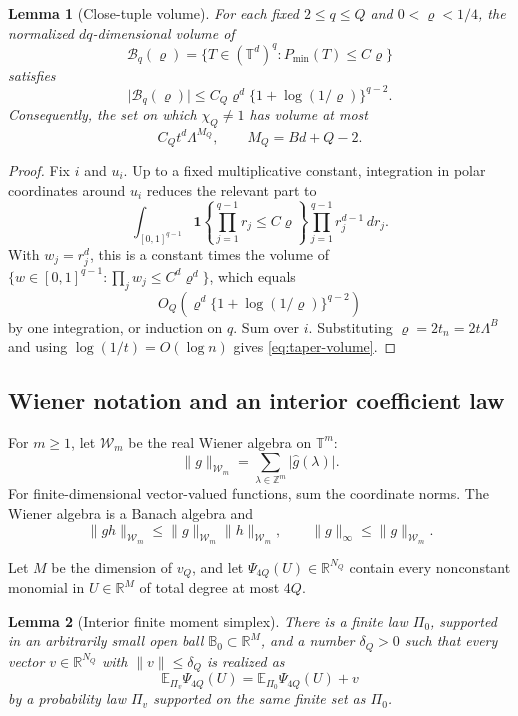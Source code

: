 \documentclass[11pt]{article}
\newtheorem{lemma}[lemma]{Lemma}
\newcommand{\E}{\mathbb{E}}
\newcommand{\R}{\mathbb{R}}
\newcommand{\Torus}{\mathbb{T}}
\newcommand{\cW}{\mathcal{W}}
\newcommand{\cB}{\mathcal{B}}
\newcommand{\norm}[1]{\lVert #1\rVert}
\newcommand{\abs}[1]{\lvert #1\rvert}
\newcommand{\one}{\mathbf{1}}
\begin{document}
\begin{lemma}[Close-tuple volume]
\label{lem:bad-volume}
For each fixed \(2\le q\le Q\) and \(0<\varrho<1/4\), the normalized
\(dq\)-dimensional volume of
\[
 \cB_q(\varrho)=\{T\in(\Torus^d)^q:P_{\min}(T)\le C\varrho\}
\]
satisfies
\begin{equation}
 \abs{\cB_q(\varrho)}
 \le C_Q\varrho^d\{1+\log(1/\varrho)\}^{q-2}.
 \label{eq:bad-volume}
\end{equation}
Consequently, the set on which \(\chi_Q\ne1\) has volume at most
\begin{equation}
 C_Qt^d\Lambda^{M_Q},\qquad M_Q=Bd+Q-2 .
 \label{eq:taper-volume}
\end{equation}
\end{lemma}

\begin{proof}
Fix \(i\) and \(u_i\).  Up to a fixed multiplicative constant, integration
in polar coordinates around \(u_i\) reduces the relevant part to
\[
 \int_{[0,1]^{q-1}}
 \one\left\{\prod_{j=1}^{q-1}r_j\le C\varrho\right\}
 \prod_{j=1}^{q-1}r_j^{d-1}\,dr_j.
\]
With \(w_j=r_j^d\), this is a constant times the volume of
\(\{w\in[0,1]^{q-1}:\prod_jw_j\le C^d\varrho^d\}\), which equals
\[
 O_Q\left(\varrho^d\{1+\log(1/\varrho)\}^{q-2}\right)
\]
by one integration, or induction on \(q\).  Sum over \(i\).  Substituting
\(\varrho=2t_n=2t\Lambda^B\) and using \(\log(1/t)=O(\log n)\) gives
\eqref{eq:taper-volume}.
\end{proof}

\subsection{Wiener notation and an interior coefficient law}

For \(m\ge1\), let \(\cW_m\) be the real Wiener algebra on \(\Torus^m\):
\[
 \norm{g}_{\cW_m}
 =\sum_{\lambda\in\mathbb Z^m}\abs{\widehat g(\lambda)}.
\]
For finite-dimensional vector-valued functions, sum the coordinate norms.
The Wiener algebra is a Banach algebra and
\begin{equation}
 \norm{gh}_{\cW_m}\le\norm g_{\cW_m}\norm h_{\cW_m},
 \qquad
 \norm g_\infty\le\norm g_{\cW_m}.
 \label{eq:wiener-algebra}
\end{equation}

Let \(M\) be the dimension of \(v_Q\), and let
\(\Psi_{4Q}(U)\in\R^{N_Q}\) contain every nonconstant monomial in
\(U\in\R^M\) of total degree at most \(4Q\).

\begin{lemma}[Interior finite moment simplex]
\label{lem:moment-simplex}
There is a finite law \(\Pi_0\), supported in an arbitrarily small open ball
\(\mathbb B_0\subset\R^M\), and a number \(\delta_Q>0\) such that every
vector \(v\in\R^{N_Q}\) with \(\norm v\le\delta_Q\) is realized as
\begin{equation}
 \E_{\Pi_v}\Psi_{4Q}(U)
 =\E_{\Pi_0}\Psi_{4Q}(U)+v
 \label{eq:moment-perturbation}
\end{equation}
by a probability law \(\Pi_v\) supported on the same finite set as
\(\Pi_0\).
\end{lemma}
\end{document}
